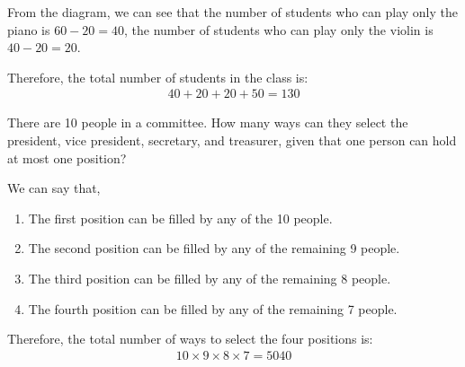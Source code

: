 \documentclass[a4paper, 10pt]{article}
\begin{document}
\begin{solution}
\par
\begin{center}
\end{center}

\par From the diagram, we can see that
the number of students who can play only the piano is \( 60 - 20 = 40 \),
the number of students who can play only the violin is \( 40 - 20 = 20 \).
\\
\par Therefore, the total number of students in the class is:
\begin{align*}
    40 + 20 + 20 + 50 = \boxed{130}
\end{align*}
\end{solution}


\begin{problem}
There are 10 people in a committee.
How many ways can they select the president, vice president, secretary, and treasurer,
given that one person can hold at most one position?
\end{problem}

\begin{solution}
We can say that,
\begin{enumerate}[wide=0pt, itemsep=2pt, parsep=0pt, leftmargin=*]
    \item The first position can be filled by any of the 10 people.
    \item The second position can be filled by any of the remaining 9 people.
    \item The third position can be filled by any of the remaining 8 people.
    \item The fourth position can be filled by any of the remaining 7 people.
\end{enumerate}

Therefore, the total number of ways to select the four positions is:
\begin{align*}
    10 \times 9 \times 8 \times 7 = \boxed{5040}
\end{align*}
\end{solution}
\end{document}
